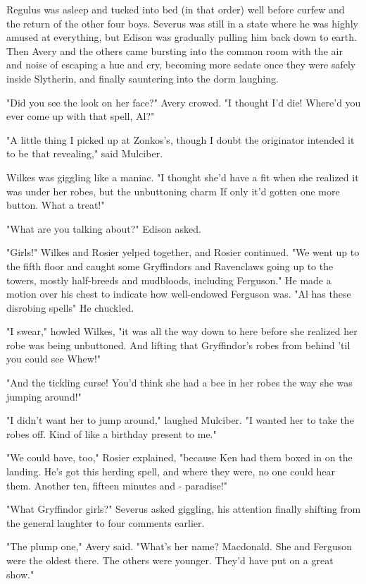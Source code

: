 Regulus was asleep and tucked into bed (in that order) well before curfew and the return of the other four boys. Severus was still in a state where he was highly amused at everything, but Edison was gradually pulling him back down to earth. Then Avery and the others came bursting into the common room with the air and noise of escaping a hue and cry, becoming more sedate once they were safely inside Slytherin, and finally sauntering into the dorm laughing.

"Did you see the look on her face?" Avery crowed. "I thought I'd die! Where'd you ever come up with that spell, Al?"

"A little thing I picked up at Zonkos's, though I doubt the originator intended it to be that{\el} revealing," said Mulciber.

Wilkes was giggling like a maniac. "I thought she'd have a fit when she realized it was under her robes, but the unbuttoning charm{\el} If only it'd gotten one more button. What a treat!"

"What are you talking about?" Edison asked.

"Girls!" Wilkes and Rosier yelped together, and Rosier continued. "We went up to the fifth floor and caught some Gryffindors and Ravenclaws going up to the towers, mostly half-breeds and mudbloods, including Ferguson." He made a motion over his chest to indicate how well-endowed Ferguson was. "Al has these disrobing spells{\el}" He chuckled.

"I swear," howled Wilkes, "it was all the way down to here before she realized her robe was being unbuttoned. And lifting that Gryffindor's robes from behind 'til you could see{\el} Whew!"

"And the tickling curse! You'd think she had a bee in her robes the way she was jumping around!"

"I didn't want her to jump around," laughed Mulciber. "I wanted her to take the robes off. Kind of like a birthday present to me."

"We could have, too," Rosier explained, "because Ken had them boxed in on the landing. He's got this herding spell, and where they were, no one could hear them. Another ten, fifteen minutes and - paradise!"

"What Gryffindor girls?" Severus asked giggling, his attention finally shifting from the general laughter to four comments earlier.

"The plump one," Avery said. "What's her name? Macdonald. She and Ferguson were the oldest there. The others were younger. They'd have put on a great show."


